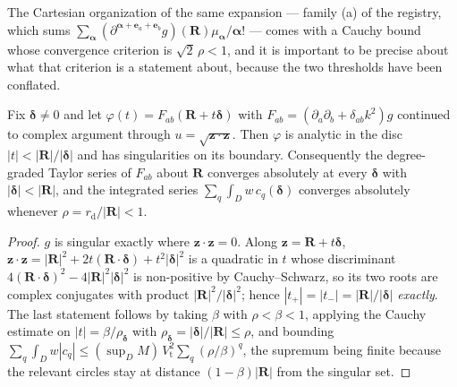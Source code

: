 The Cartesian organization of the same expansion --- family (a) of the registry, which
sums $\sum_{\boldsymbol{\alpha}}(\partial^{\boldsymbol{\alpha}+\mathbf{e}_a+\mathbf{e}_b}
g)(\mathbf{R})\mu_{\boldsymbol{\alpha}}/\boldsymbol{\alpha}!$ --- comes with a Cauchy
bound whose convergence criterion is $\sqrt{2}\,\rho < 1$, and it is important to be
precise about what that criterion is a statement about, because the two thresholds have
been conflated.

\begin{proposition}
\label{prop:bnd:rho}
Fix $\boldsymbol{\delta} \neq 0$ and let $\varphi(t) = F_{ab}(\mathbf{R}+t\boldsymbol{\delta})$
with $F_{ab} = (\partial_a\partial_b+\delta_{ab}k^2)g$ continued to complex argument
through $u = \sqrt{\mathbf{z}\cdot\mathbf{z}}$. Then $\varphi$ is analytic in the disc
$|t| < |\mathbf{R}|/|\boldsymbol{\delta}|$ and has singularities on its boundary.
Consequently the degree-graded Taylor series of $F_{ab}$ about $\mathbf{R}$ converges
absolutely at every $\boldsymbol{\delta}$ with $|\boldsymbol{\delta}| < |\mathbf{R}|$,
and the integrated series $\sum_q \int_D w\,c_q(\boldsymbol{\delta})$ converges
absolutely whenever $\rho = r_{\mathrm{d}}/|\mathbf{R}| < 1$.
\end{proposition}

\begin{proof}
$g$ is singular exactly where $\mathbf{z}\cdot\mathbf{z} = 0$. Along
$\mathbf{z} = \mathbf{R}+t\boldsymbol{\delta}$,
$\mathbf{z}\cdot\mathbf{z} = |\mathbf{R}|^2 + 2t(\mathbf{R}\cdot\boldsymbol{\delta})
+ t^2|\boldsymbol{\delta}|^2$ is a quadratic in $t$ whose discriminant
$4(\mathbf{R}\cdot\boldsymbol{\delta})^2 - 4|\mathbf{R}|^2|\boldsymbol{\delta}|^2$ is
non-positive by Cauchy--Schwarz, so its two roots are complex conjugates with product
$|\mathbf{R}|^2/|\boldsymbol{\delta}|^2$; hence
$|t_+| = |t_-| = |\mathbf{R}|/|\boldsymbol{\delta}|$ \emph{exactly}. The last statement
follows by taking $\beta$ with $\rho < \beta < 1$, applying the Cauchy estimate on
$|t| = \beta/\rho_{\boldsymbol{\delta}}$ with $\rho_{\boldsymbol{\delta}} =
|\boldsymbol{\delta}|/|\mathbf{R}| \le \rho$, and bounding
$\sum_q\int_D w|c_q| \le (\sup_D M)\,V_{\mathrm{t}}^{2}\sum_q(\rho/\beta)^{q}$, the
supremum being finite because the relevant circles stay at distance
$(1-\beta)|\mathbf{R}|$ from the singular set.
\end{proof}

